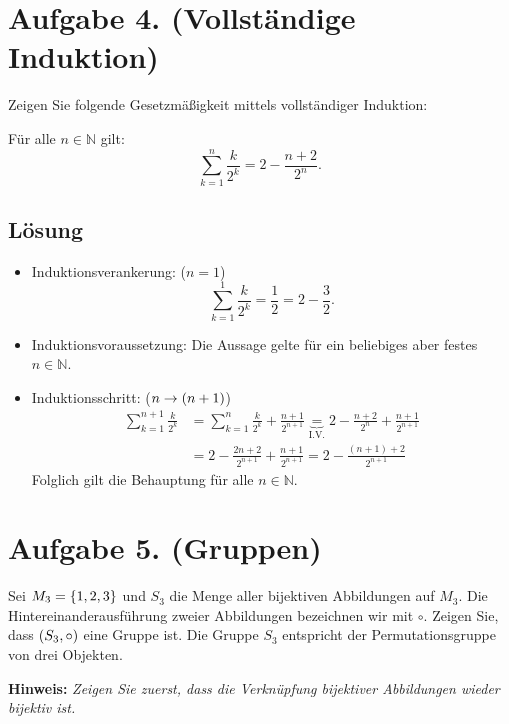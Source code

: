 \documentclass[german,12pt]{homework}
\newcommand{\NN}{\mathbb{N}}
\DeclarePairedDelimiter{\enbrace}{(}{)}
\DeclarePairedDelimiter{\penbrace}{\{}{\}}
\begin{document}
    \section*{Aufgabe 4. (Vollständige Induktion)}

    \begin{problem}
        Zeigen Sie folgende Gesetzmäßigkeit mittels vollständiger Induktion:

        Für alle \(n \in \NN\) gilt:
        \[\sum_{k = 1}^n\frac{k}{2^k} = 2 - \frac{n + 2}{2^n}.\]
    \end{problem}

    \subsection*{Lösung}
    \begin{itemize}
        \item Induktionsverankerung: (\(n = 1\))
        \[\sum_{k = 1}^1\frac{k}{2^k} = \frac{1}{2} = 2 - \frac{3}{2}.\]
        \item Induktionsvoraussetzung: Die Aussage gelte für ein beliebiges aber festes \(n \in \NN\).
        \item Induktionsschritt: (\(n \to \enbrace*{n + 1}\))
        \begin{align*}
            \sum_{k = 1}^{n + 1}\frac{k}{2^k} &= \sum_{k = 1}^{n}\frac{k}{2^k} + \frac{n + 1}{2^{n + 1}} \underbrace{=}_\text{I.V.} 2 - \frac{n + 2}{2^n} + \frac{n + 1}{2^{n + 1}}\\
            &= 2 - \frac{2n + 2}{2^{n + 1}} + \frac{n + 1}{2^{n + 1}} = 2 - \frac{(n + 1) + 2}{2^{n + 1}}
        \end{align*}
        Folglich gilt die Behauptung für alle \(n \in \NN\).
    \end{itemize}

    \section*{Aufgabe 5. (Gruppen)}

    \begin{problem}
        Sei \(M_3 = \penbrace*{1, 2, 3}\) und \(S_3\) die Menge aller bijektiven Abbildungen auf \(M_3\). Die Hintereinanderausführung zweier Abbildungen bezeichnen wir mit \(\circ\). Zeigen Sie, dass \(\enbrace*{S_3, \circ}\) eine Gruppe ist. Die Gruppe \(S_3\) entspricht der Permutationsgruppe von drei Objekten.

        \textbf{Hinweis:} \quad \emph{Zeigen Sie zuerst, dass die Verknüpfung bijektiver Abbildungen wieder bijektiv ist.}
    \end{problem}
\end{document}
